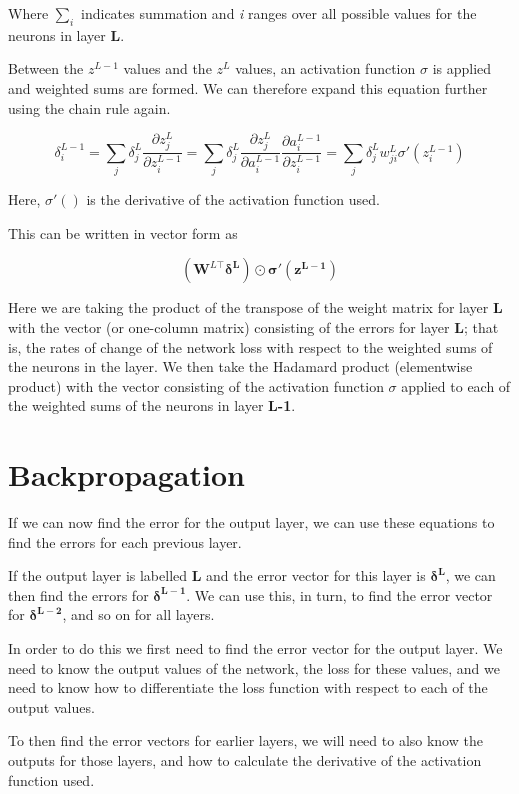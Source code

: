 \documentclass[12pt]{article}
\begin{document}
Where $\sum_{i}$ indicates summation and \textit{i} ranges over all possible values for the neurons in layer \textbf{L}.

Between the $z^{L-1}$ values and the $z^{L}$ values, an activation function $\sigma$ is applied and weighted sums are formed. We can therefore expand this equation further using the chain rule again.

\begin{equation} \label{eq:6}
\delta^{L-1}_i=
\sum_{j} \delta^{L}_{j}\frac{\partial z^{L}_j}{\partial z^{L-1}_i}
=
\sum_{j} \delta^{L}_{j}\frac{\partial z^{L}_j}{\partial a^{L-1}_i}
\frac{\partial a^{L-1}_i}{\partial z^{L-1}_i}
=\sum_{j} \delta^{L}_{j}w^{L}_{ji}\sigma'(z^{L-1}_{i})
\end{equation}

Here, $\sigma'()$ is the derivative of the activation function used.

This can be written in vector form as

\begin{equation} \label{eq:7}
\boxed{
(\mathbf{W}^{L\top}\mathbf{\delta^{L}})\odot\mathbf{\sigma'(z^{L-1})}
}
\end{equation}

Here we are taking the product of the transpose of the weight matrix for layer \textbf{L} with the vector (or one-column matrix) consisting of the errors for layer \textbf{L}; that is, the rates of change of the network loss with respect to the weighted sums of the neurons in the layer. We then take the Hadamard product (elementwise product) with the vector consisting of the activation function $\sigma$ applied to each of the weighted sums of the neurons in layer \textbf{L-1}.

\section{Backpropagation}

If we can now find the error for the output layer, we can use these equations to find the errors for each previous layer.

If the output layer is labelled \textbf{L} and the error vector for this layer is $\mathbf{\delta^{L}}$, we can then find the errors for $\mathbf{\delta^{L-1}}$. We can use this, in turn, to find the error vector for $\mathbf{\delta^{L-2}}$, and so on for all layers.

In order to do this we first need to find the error vector for the output layer. We need to know the output values of the network, the loss for these values, and we need to know how to differentiate the loss function with respect to each of the output values.

To then find the error vectors for earlier layers, we will need to also know the outputs for those layers, and how to calculate the derivative of the activation function used.




\end{document}
